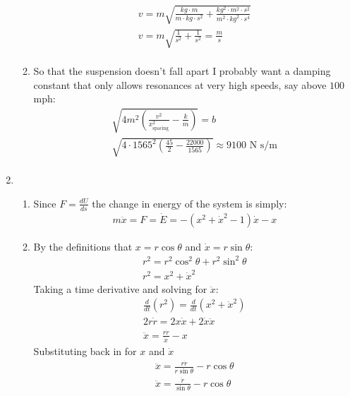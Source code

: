 \documentclass[12pt]{article}
\begin{document}
\begin{enumerate}
\begin{enumerate}
\begin{gather*}
                v=m\sqrt{\frac{kg\cdot m}{m\cdot kg\cdot s^2}+\frac{kg^2\cdot m^2\cdot s^2}{m^2\cdot kg^2\cdot s^4}}\\
                v=m\sqrt{\frac{1}{s^2}+\frac{1}{s^2}}=\frac{m}{s}\\
            \end{gather*}
            \item
            So that the suspension doesn't fall apart I probably want a damping constant that only allows resonances at very high speeds, say above $100$ mph:
            \begin{gather*}
                \sqrt{4m^2\left(\frac{v^2}{x^2_\text{spacing}}-\frac{k}{m}\right)}=b\\
                \sqrt{4\cdot1565^2\left(\frac{45}{2}-\frac{22000}{1565}\right)}\approx 9100\text{ N s/m}\\
            \end{gather*}
        \end{enumerate}
        \item
        \begin{enumerate}
            \item
            Since $F=\frac{dU}{ds}$ the change in energy of the system is simply:
            \begin{gather*}
                m\ddot{x}=F=\dot{E}=-\left(x^2+\dot{x}^2-1\right)\dot{x}-x
            \end{gather*}
            \item
            By the definitions that $x=r\cos\theta$ and $\dot{x}=r\sin\theta$:
            \begin{gather*}
                r^2=r^2\cos^2\theta+r^2\sin^2\theta\\
                r^2=x^2+\dot{x}^2
            \end{gather*}
            Taking a time derivative and solving for $\ddot{x}$:
            \begin{gather*}
                \frac{d}{dt}(r^2)=\frac{d}{dt}\left(x^2+\dot{x}^2\right)\\
                2r\dot{r}=2x\dot{x}+2\dot{x}\ddot{x}\\
                \ddot{x}=\frac{r\dot{r}}{\dot{x}}-x
            \end{gather*}
            Substituting back in for $x$ and $\dot{x}$
            \begin{gather*}
                \ddot{x}=\frac{r\dot{r}}{r\sin\theta}-r\cos\theta\\
                \ddot{x}=\frac{\dot{r}}{\sin\theta}-r\cos\theta

\end{gather*}
\end{enumerate}
\end{enumerate}
\end{document}
